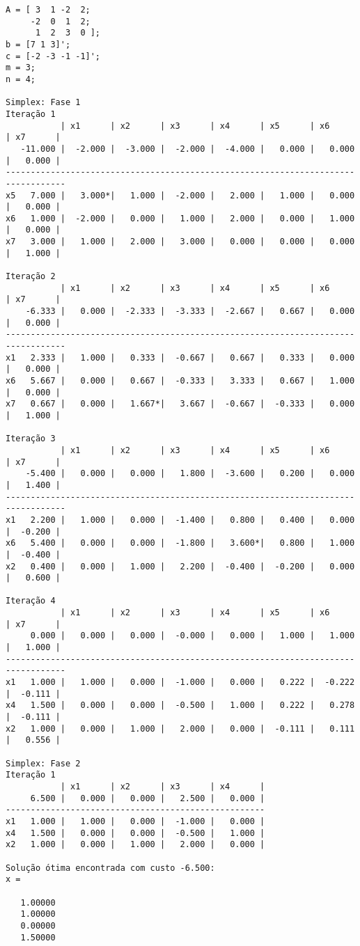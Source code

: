 \documentclass[brazil,times]{abnt}
\begin{document}
{\scriptsize \begin{verbatim}
A = [ 3  1 -2  2;
     -2  0  1  2;
      1  2  3  0 ];
b = [7 1 3]';
c = [-2 -3 -1 -1]';
m = 3;
n = 4;

Simplex: Fase 1
Iteração 1
           | x1      | x2      | x3      | x4      | x5      | x6      | x7      |
   -11.000 |  -2.000 |  -3.000 |  -2.000 |  -4.000 |   0.000 |   0.000 |   0.000 |
----------------------------------------------------------------------------------
x5   7.000 |   3.000*|   1.000 |  -2.000 |   2.000 |   1.000 |   0.000 |   0.000 |
x6   1.000 |  -2.000 |   0.000 |   1.000 |   2.000 |   0.000 |   1.000 |   0.000 |
x7   3.000 |   1.000 |   2.000 |   3.000 |   0.000 |   0.000 |   0.000 |   1.000 |

Iteração 2
           | x1      | x2      | x3      | x4      | x5      | x6      | x7      |
    -6.333 |   0.000 |  -2.333 |  -3.333 |  -2.667 |   0.667 |   0.000 |   0.000 |
----------------------------------------------------------------------------------
x1   2.333 |   1.000 |   0.333 |  -0.667 |   0.667 |   0.333 |   0.000 |   0.000 |
x6   5.667 |   0.000 |   0.667 |  -0.333 |   3.333 |   0.667 |   1.000 |   0.000 |
x7   0.667 |   0.000 |   1.667*|   3.667 |  -0.667 |  -0.333 |   0.000 |   1.000 |

Iteração 3
           | x1      | x2      | x3      | x4      | x5      | x6      | x7      |
    -5.400 |   0.000 |   0.000 |   1.800 |  -3.600 |   0.200 |   0.000 |   1.400 |
----------------------------------------------------------------------------------
x1   2.200 |   1.000 |   0.000 |  -1.400 |   0.800 |   0.400 |   0.000 |  -0.200 |
x6   5.400 |   0.000 |   0.000 |  -1.800 |   3.600*|   0.800 |   1.000 |  -0.400 |
x2   0.400 |   0.000 |   1.000 |   2.200 |  -0.400 |  -0.200 |   0.000 |   0.600 |

Iteração 4
           | x1      | x2      | x3      | x4      | x5      | x6      | x7      |
     0.000 |   0.000 |   0.000 |  -0.000 |   0.000 |   1.000 |   1.000 |   1.000 |
----------------------------------------------------------------------------------
x1   1.000 |   1.000 |   0.000 |  -1.000 |   0.000 |   0.222 |  -0.222 |  -0.111 |
x4   1.500 |   0.000 |   0.000 |  -0.500 |   1.000 |   0.222 |   0.278 |  -0.111 |
x2   1.000 |   0.000 |   1.000 |   2.000 |   0.000 |  -0.111 |   0.111 |   0.556 |

Simplex: Fase 2
Iteração 1
           | x1      | x2      | x3      | x4      |
     6.500 |   0.000 |   0.000 |   2.500 |   0.000 |
----------------------------------------------------
x1   1.000 |   1.000 |   0.000 |  -1.000 |   0.000 |
x4   1.500 |   0.000 |   0.000 |  -0.500 |   1.000 |
x2   1.000 |   0.000 |   1.000 |   2.000 |   0.000 |

Solução ótima encontrada com custo -6.500:
x =

   1.00000
   1.00000
   0.00000
   1.50000
\end{verbatim} }
\end{document}

